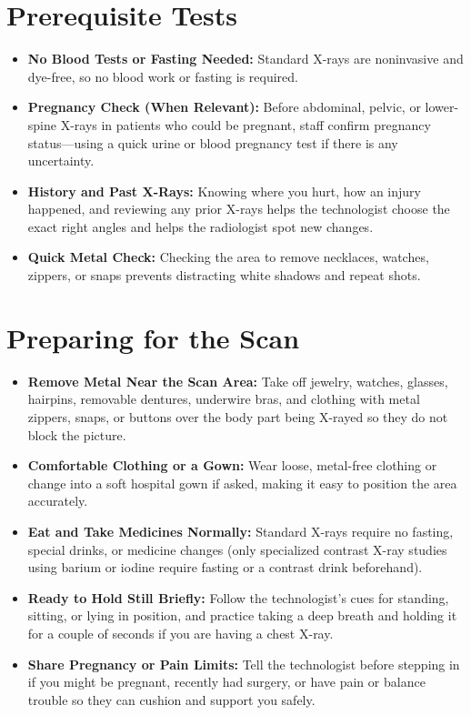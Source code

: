 \section{Prerequisite Tests}

\begin{itemize}
    \item \textbf{No Blood Tests or Fasting Needed:} Standard X-rays are noninvasive and dye-free, so no blood work or fasting is required.
    \item \textbf{Pregnancy Check (When Relevant):} Before abdominal, pelvic, or lower-spine X-rays in patients who could be pregnant, staff confirm pregnancy status---using a quick urine or blood pregnancy test if there is any uncertainty.
    \item \textbf{History and Past X-Rays:} Knowing where you hurt, how an injury happened, and reviewing any prior X-rays helps the technologist choose the exact right angles and helps the radiologist spot new changes.
    \item \textbf{Quick Metal Check:} Checking the area to remove necklaces, watches, zippers, or snaps prevents distracting white shadows and repeat shots.
\end{itemize}

\section{Preparing for the Scan}

\begin{itemize}
    \item \textbf{Remove Metal Near the Scan Area:} Take off jewelry, watches, glasses, hairpins, removable dentures, underwire bras, and clothing with metal zippers, snaps, or buttons over the body part being X-rayed so they do not block the picture.
    \item \textbf{Comfortable Clothing or a Gown:} Wear loose, metal-free clothing or change into a soft hospital gown if asked, making it easy to position the area accurately.
    \item \textbf{Eat and Take Medicines Normally:} Standard X-rays require no fasting, special drinks, or medicine changes (only specialized contrast X-ray studies using barium or iodine require fasting or a contrast drink beforehand).
    \item \textbf{Ready to Hold Still Briefly:} Follow the technologist's cues for standing, sitting, or lying in position, and practice taking a deep breath and holding it for a couple of seconds if you are having a chest X-ray.
    \item \textbf{Share Pregnancy or Pain Limits:} Tell the technologist before stepping in if you might be pregnant, recently had surgery, or have pain or balance trouble so they can cushion and support you safely.
\end{itemize}

